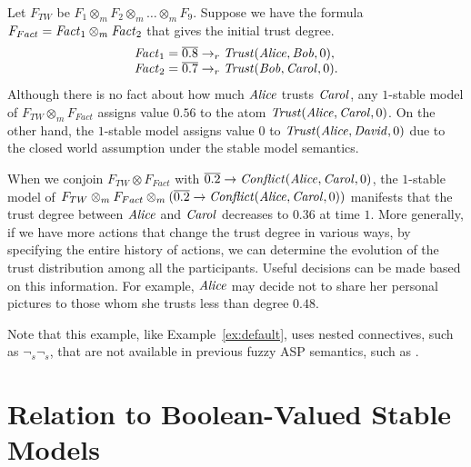 \documentclass[runningheads]{llncs}
\def\ba{\begin{array}}
\def\ea{\end{array}}
\def\i#1{\hbox{\it #1\/}}
\def\rar{\rightarrow}
\def\i#1{\hbox{\itshape #1\/}}
\def\fand{\otimes}
\begin{document}
\begin{example}
Let $F_{TW}$ be $F_1 \otimes_m F_2 \otimes_m \dots \otimes_m F_9$. 
%
%
%
%
Suppose we have the formula $F_{Fact}=\i{Fact}_1\fand_m\i{Fact}_2$ that
gives the initial trust degree.
\[
\ba l
   \i{Fact}_1 = \overline{0.8}\rar_r\i{Trust}(\i{Alice}, \i{Bob}, 0), \\
   \i{Fact}_2 = \overline{0.7}\rar_r\i{Trust}(\i{Bob}, \i{Carol}, 0).
\ea 
\]
Although there is no fact about how much $\i{Alice}$ trusts
$\i{Carol}$, any $1$-stable model of $F_{TW}\fand_m F_{Fact}$ assigns
value $0.56$ to the atom $\i{Trust}(\i{Alice}, \i{Carol}, 0)$. On the other
hand, the $1$-stable model assigns value $0$ to
$\i{Trust}(\i{Alice},\i{David},0)$ due to the closed world assumption under
the stable model semantics.

When we conjoin  $F_{TW}\fand F_{Fact}$ with 
$\overline{0.2}\rar\i{Conflict}(\i{Alice},\i{Carol}, 0)$, 
the $1$-stable model of 
$F_{TW}\fand_m
F_{Fact}\fand_m (\overline{0.2}\rar\i{Conflict}(\i{Alice},\i{Carol},
0))$
manifests that the trust degree between $\i{Alice}$ and $\i{Carol}$
decreases to $0.36$ at time $1$. More generally, if we have more actions that
change the trust degree in various ways, by specifying the entire
history of actions, we can determine the evolution of the trust
distribution among all the participants. Useful decisions can
be made based on this information. For example, $\i{Alice}$ may decide not to
share her personal pictures to those whom she trusts less than degree
$0.48$.
\end{example}

Note that this example, like Example~\ref{ex:default}, uses nested
connectives, such as $\neg_{\!s}\neg_{\!s}$, that are not available in
previous fuzzy ASP semantics, such as
\cite{lukasiewicz06fuzzy,janssen12reducing}.


\vspace{-0.3cm}


\section{Relation to Boolean-Valued Stable Models} \label{sec:rel-bool} 
\end{document}
